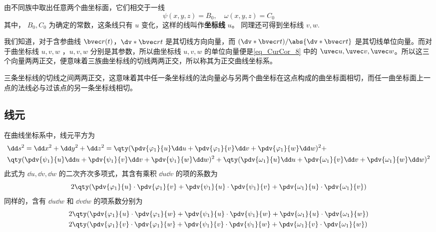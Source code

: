 由不同族中取出任意两个曲坐标面，它们相交于一线
\begin{equation}
\psi(x,y,z)=B_0,\quad \omega(x,y,z)=C_0
\end{equation}
其中， $B_0,C_0$ 为确定的常数，这条线只有 $u$ 变化，这样的线叫作\textbf{坐标线} $u$。 同理还可得到坐标线 $v,w$.

我们知道，对于含参曲线 $\bvec r(t)$，$\dv*{\bvec r}{t}$ 是其切线方向向量，而 $(\dv*{\bvec r}{t})/\abs{\dv*{\bvec r}{t}}$ 是其切线单位向量。而对于曲坐标线 $u,v,w$ ，$u,v,w$ 分别是其参数，所以曲坐标线 $u,v,w$ 的单位向量便是\autoref{eq_CurCor_8} 中的 $\uvec u,\uvec v,\uvec w$。所以这三个向量两两正交，便意味着三族曲坐标线的切线两两正交，所以称其为正交曲线坐标系。

三条坐标线的切线之间两两正交，这意味着其中任一条坐标线的法向量必与另两个曲坐标在这点构成的曲坐标面相切，而任一曲坐标面上一点的法线必与过该点的另一条坐标线相切。

\subsection{线元}
在曲线坐标系中，线元平方为
\begin{equation}\label{eq_CurCor_1}
\begin{aligned}
&\dd s^2=\dd x^2+\dd y^2+\dd z^2=\qty(\pdv{\varphi_1}{u}\dd u+\pdv{\varphi_1}{v}\dd v+\pdv{\varphi_1}{w}\dd w)^2+\\ 
&\qty(\pdv{\psi_1}{u}\dd u+\pdv{\psi_1}{v}\dd v+\pdv{\psi_1}{w}\dd w)^2+\qty(\pdv{\omega_1}{u}\dd u+\pdv{\omega_1}{v}\dd v+\pdv{\omega_1}{w}\dd w)^2
\end{aligned}
\end{equation}
此式为 $\dd u,\dd v,\dd w$ 的二次齐次多项式，其含有乘积 $\dd u \dd v$ 的项的系数为
\begin{equation}
2\qty(\pdv{\varphi_1}{u}\cdot\pdv{\varphi_1}{v}+\pdv{\psi_1}{u}\cdot\pdv{\psi_1}{v}+\pdv{\omega_1}{u}\cdot\pdv{\omega_1}{v})
\end{equation}
同样的，含有 $\dd u\dd w$ 和 $\dd v\dd w$ 的项系数分别为
\begin{equation}
\begin{aligned}
& 2\qty(\pdv{\varphi_1}{u}\cdot\pdv{\varphi_1}{w}+\pdv{\psi_1}{u}\cdot\pdv{\psi_1}{w}+\pdv{\omega_1}{u}\cdot\pdv{\omega_1}{w})\\
&2\qty(\pdv{\varphi_1}{v}\cdot\pdv{\varphi_1}{w}+\pdv{\psi_1}{v}\cdot\pdv{\psi_1}{w}+\pdv{\omega_1}{v}\cdot\pdv{\omega_1}{w})
\end{aligned}
\end{equation}

